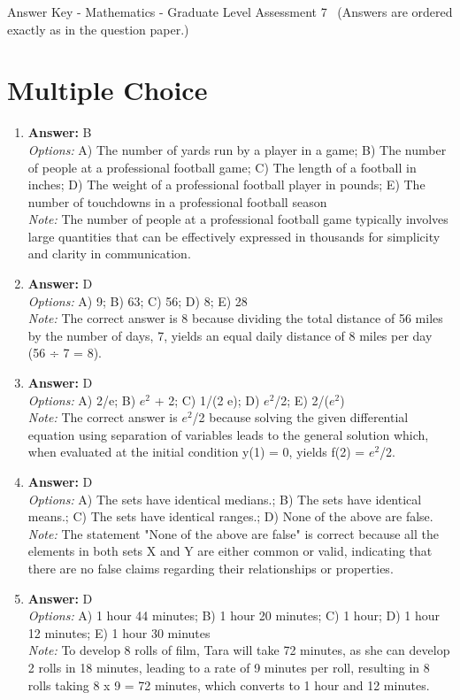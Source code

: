 \documentclass[12pt]{article}
\begin{document}
\begin{center}
Answer Key - Mathematics - Graduate Level Assessment 7 \
\small (Answers are ordered exactly as in the question paper.)
\end{center}

\section*{Multiple Choice}
\begin{enumerate}[label=\arabic*.]
\item \textbf{Answer:} B
\\ \textit{Options:} A) The number of yards run by a player in a game; B) The number of people at a professional football game; C) The length of a football in inches; D) The weight of a professional football player in pounds; E) The number of touchdowns in a professional football season
\\ \textit{Note:} The number of people at a professional football game typically involves large quantities that can be effectively expressed in thousands for simplicity and clarity in communication.
\item \textbf{Answer:} D
\\ \textit{Options:} A) 9; B) 63; C) 56; D) 8; E) 28
\\ \textit{Note:} The correct answer is 8 because dividing the total distance of 56 miles by the number of days, 7, yields an equal daily distance of 8 miles per day (56 ÷ 7 = 8).
\item \textbf{Answer:} D
\\ \textit{Options:} A) 2/e; B) $e^2$ + 2; C) 1/(2 e); D) $e^2$/2; E) 2/($e^2$)
\\ \textit{Note:} The correct answer is $e^2$/2 because solving the given differential equation using separation of variables leads to the general solution which, when evaluated at the initial condition y(1) = 0, yields f(2) = $e^2$/2.
\item \textbf{Answer:} D
\\ \textit{Options:} A) The sets have identical medians.; B) The sets have identical means.; C) The sets have identical ranges.; D) None of the above are false.
\\ \textit{Note:} The statement "None of the above are false" is correct because all the elements in both sets X and Y are either common or valid, indicating that there are no false claims regarding their relationships or properties.
\item \textbf{Answer:} D
\\ \textit{Options:} A) 1 hour 44 minutes; B) 1 hour 20 minutes; C) 1 hour; D) 1 hour 12 minutes; E) 1 hour 30 minutes
\\ \textit{Note:} To develop 8 rolls of film, Tara will take 72 minutes, as she can develop 2 rolls in 18 minutes, leading to a rate of 9 minutes per roll, resulting in 8 rolls taking 8 x 9 = 72 minutes, which converts to 1 hour and 12 minutes.
\end{enumerate}
\end{document}
